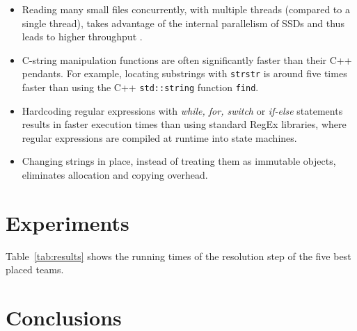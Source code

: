 \documentclass[sigconf]{acmart}
\begin{document}
\begin{itemize}
\item Reading many small files concurrently, with multiple threads (compared to a single thread), takes advantage of the internal parallelism of SSDs and thus leads to higher throughput \cite{Zhuang2016}.

\item C-string manipulation functions are often significantly faster than their C++ pendants. For example, locating substrings with \texttt{strstr} is around five times faster than using the C++ \texttt{std::string} function \texttt{find}.

\item Hardcoding regular expressions with \emph{while, for, switch} or \emph{if-else} statements results in faster execution times than using standard RegEx libraries, where regular expressions are compiled at runtime into state machines.

\item Changing strings in place, instead of treating them as immutable objects, eliminates allocation and copying overhead.

\end{itemize}


\section{Experiments}

Table~\ref{tab:results} shows the running times of the resolution step of the five best placed teams.


\begin{table}[htbp]
  \caption{Comparison of the F-measure and the running times of the resolution step of the five best placed teams. The input data for the resolution step consisted of 29{,}787 in JSON formatted e-commerce websites. Measurements were taken on a
laptop running Ubuntu 19.04 with 16 GB of RAM and two Intel Core i5-4310U CPUs. The underlying SSD was a 500\,GB 860 EVO mSATA. We cleared the page cache, dentries, and inodes before each run to avoid reading the input data from RAM instead of the SSD.}
  \label{tab:results}
\end{table}


\section{Conclusions}



\end{document}
